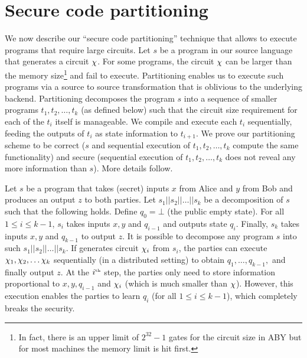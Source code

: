 \section{Secure code partitioning}
\label{sec:pipe}

\newcommand{\prog}{s}
\newcommand{\progn}{t}
\newcommand{\seq}{||}
\newcommand{\state}{q}

We  now describe our ``secure code partitioning'' technique that
allows \tool to execute programs that require large circuits.
Let $\prog$ be a program in our source language that
generates a circuit $\chi$. For some programs, the circuit $\chi$
can be larger than
the memory size\footnote{In fact, there is
  an upper limit of $2^{32}-1$ gates for the circuit size in ABY but
  for most machines the memory limit is hit first.} and fail to
execute. Partitioning enables us to 
execute such programs via a source to source transformation that is
oblivious to the underlying \mpc backend. Partitioning decomposes the
program $\prog$ into a sequence of smaller \tool programs
$\progn_1,\progn_2,\ldots,\progn_k$ (as defined below) such
that the circuit size
requirement for each of the $\progn_i$ itself is manageable. We compile
and execute each $\progn_i$ sequentially, feeding the outputs of
$\progn_i$ as state
information to $\progn_{i+1}$. We prove our partitioning scheme to be
correct ($\prog$ and sequential execution of $\progn_1,\progn_2,\ldots,\progn_k$ compute
the same functionality) and secure (sequential execution of
$\progn_1,\progn_2,\ldots,\progn_k$ does
not reveal any more information than $\prog$). More details follow.

Let $\prog$ be a program that takes (secret) inputs $x$ from Alice and
$y$ from Bob and produces an output $z$ to both parties. Let
$\prog_1\seq\prog_2\seq\dots\seq\prog_k$ be a decomposition of $\prog$
such that the following holds. Define $\state_0 = \bot$ (the public empty
state). For all
$1\leq i\leq k-1$, $\prog_i$ takes inputs $x, y$ and $\state_{i-1}$ and
outputs state $\state_i$. Finally, $\prog_k$ takes inputs $x, y$ and
$\state_{k-1}$ to  output $z$. It is
possible to decompose any program $\prog$  into such
$\prog_1\seq\prog_2\seq\dots\seq\prog_k$. If \tool generates circuit
$\chi_i$ from
$\prog_i$, the parties can execute
$\chi_1, \chi_2, \dots \chi_k$
sequentially (in a distributed setting)  to obtain
$\state_1,\dots,\state_{k-1},$ and finally output $z$. At the
$i^{\textrm{\tiny{th}}}$ step, the parties only need to store
information proportional to $x,y,\state_{i-1}$ and $\chi_i$ (which is
much smaller than $\chi$). However, this execution enables the
parties to learn $\state_i$ (for all $1\leq i\leq k-1$), which
completely breaks the security.

